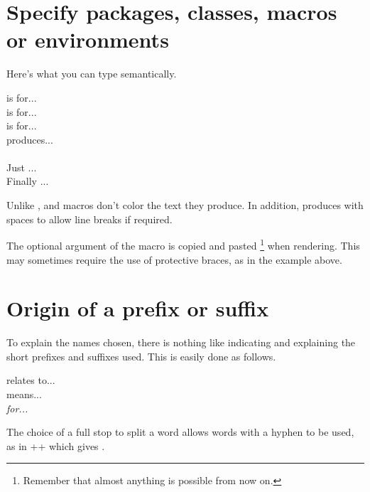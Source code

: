 \documentclass{tutodoc}
\begin{document}
\section{Specify packages, classes, macros or environments}

Here's what you can type semantically.


\begin{tdoclatex}
 is for...              \\
 is for...           \\
 is for...           \\
 produces...                \\
            \\
Just ...                   \\
Finally ...
\end{tdoclatex}


\begin{tdocrem}
    Unlike ,  and  macros don't color the text they produce.
    In addition,  produces  with spaces to allow line breaks if required.
\end{tdocrem}


\begin{tdocwarn}
    The optional argument of the  macro is copied and pasted
    \footnote{
        Remember that almost anything is possible from now on.
    }
    when rendering. This may sometimes require the use of protective braces, as in the example above.
\end{tdocwarn}



\section{Origin of a prefix or suffix}

To explain the names chosen, there is nothing like indicating and explaining the short prefixes and suffixes used. This is easily done as follows.


\begin{tdoclatex}
 relates to...      \\
 means...   \\
\emph{ for...}
\end{tdoclatex}


\begin{tdocrem}
    The choice of a full stop to split a word allows words with a hyphen to be used, as in \tdoclatexin++ which gives .
\end{tdocrem}
\end{document}
